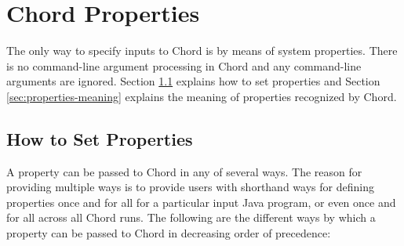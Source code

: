 \chapter{Chord Properties}
\label{chap:properties}

The only way to specify inputs to Chord is by means of system properties.
There is no command-line argument processing in Chord and any command-line arguments are ignored.
Section \ref{sec:properties-setting} explains how to set properties and
Section \ref{sec:properties-meaning} explains the meaning of properties recognized by Chord.

\section{How to Set Properties}
\label{sec:properties-setting}

A property can be passed to Chord in any of several ways.
The reason for providing multiple ways is to provide users with shorthand ways for defining properties
once and for all for a particular input Java program, or even once and for all across all Chord runs. 
The following are the different ways by which a property can be passed to Chord in decreasing order of precedence:

